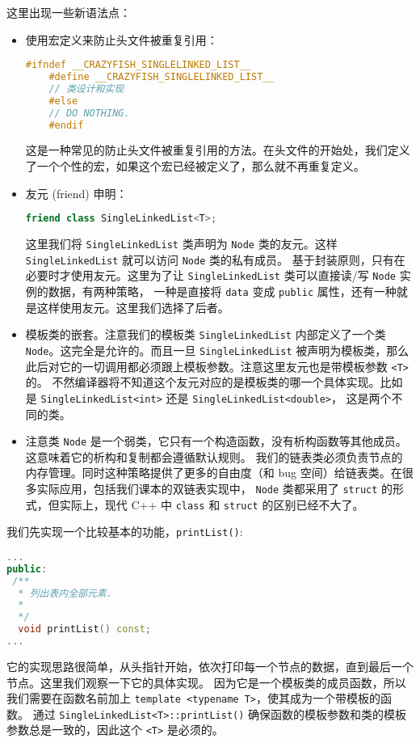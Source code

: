 \documentclass[a4paper]{ctexart}
\theoremstyle{definition}
\theoremstyle{definition}
\begin{document}
这里出现一些新语法点：
\begin{itemize}
  \item 使用宏定义来防止头文件被重复引用：
  \begin{lstlisting}[language=c++]
    #ifndef __CRAZYFISH_SINGLELINKED_LIST__
    #define __CRAZYFISH_SINGLELINKED_LIST__
    // 类设计和实现
    #else 
    // DO NOTHING.
    #endif     
  \end{lstlisting}
  这是一种常见的防止头文件被重复引用的方法。在头文件的开始处，我们定义了一个个性的宏，如果这个宏已经被定义了，那么就不再重复定义。
  \item 友元 (friend) 申明：
  \begin{lstlisting}[language=c++]
    friend class SingleLinkedList<T>;
  \end{lstlisting}
  这里我们将 \verb|SingleLinkedList| 类声明为 \verb|Node| 类的友元。这样 \verb|SingleLinkedList| 就可以访问 \verb|Node| 类的私有成员。
  基于封装原则，只有在必要时才使用友元。这里为了让 \verb|SingleLinkedList| 类可以直接读/写 \verb|Node| 实例的数据，有两种策略，
  一种是直接将 \verb|data| 变成 \verb|public| 属性，还有一种就是这样使用友元。这里我们选择了后者。 
  \item 模板类的嵌套。注意我们的模板类 \verb|SingleLinkedList| 内部定义了一个类 \verb|Node|。这完全是允许的。而且一旦 \verb|SingleLinkedList| 
  被声明为模板类，那么此后对它的一切调用都必须跟上模板参数。注意这里友元也是带模板参数 \verb|<T>| 的。
  不然编译器将不知道这个友元对应的是模板类的哪一个具体实现。比如是 \verb|SingleLinkedList<int>| 还是 \verb|SingleLinkedList<double>|， 
  这是两个不同的类。
  \item 注意类 \verb|Node| 是一个弱类，它只有一个构造函数，没有析构函数等其他成员。这意味着它的析构和复制都会遵循默认规则。
  我们的链表类必须负责节点的内存管理。同时这种策略提供了更多的自由度（和 bug 空间）给链表类。在很多实际应用，包括我们课本的双链表实现中，
  \verb|Node| 类都采用了 \verb|struct| 的形式，但实际上，现代 C++ 中 \verb|class| 和 \verb|struct| 的区别已经不大了。
\end{itemize}

我们先实现一个比较基本的功能，\verb|printList()|:
\begin{lstlisting}[language=c++]
... 
public:
 /** 
  * 列出表内全部元素.
  * 
  */
  void printList() const;
... 
\end{lstlisting}

它的实现思路很简单，从头指针开始，依次打印每一个节点的数据，直到最后一个节点。这里我们观察一下它的具体实现。
因为它是一个模板类的成员函数，所以我们需要在函数名前加上 \verb|template <typename T>|，使其成为一个带模板的函数。
通过 \verb|SingleLinkedList<T>::printList()| 确保函数的模板参数和类的模板参数总是一致的，因此这个 \verb|<T>| 是必须的。
\end{document}
